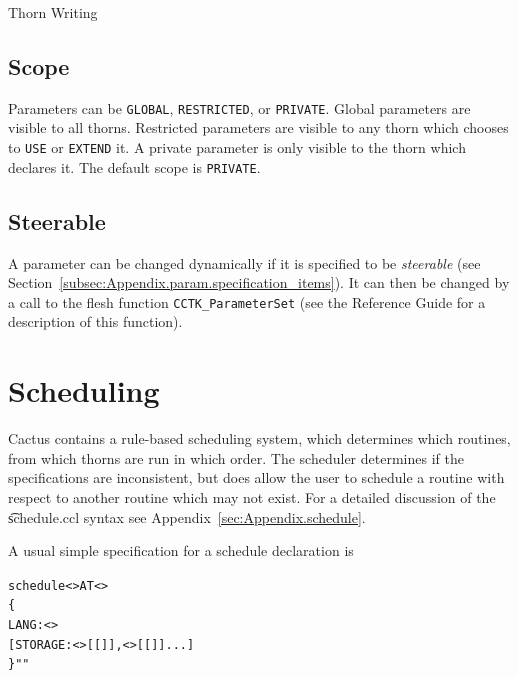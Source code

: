 \begin{cactuspart}{Thorn Writing}

\subsection{Scope}
\label{sec:Cactus_parameters.scope}

Parameters can be \texttt{GLOBAL}, \texttt{RESTRICTED}, or \texttt{PRIVATE}.
Global parameters are visible to all thorns.  Restricted parameters
are visible to any thorn which chooses to \texttt{USE} or \texttt{EXTEND}
it.  A private parameter is only visible to the thorn which declares
it.  The default scope is \texttt{PRIVATE}.

\subsection{Steerable}
\label{sec:Cactus_parameters.steerable}
A parameter can be changed dynamically if it is specified to be
\textit{steerable} (see
Section~\ref{subsec:Appendix.param.specification_items}).
It can then be changed by a call to the flesh function
\texttt{CCTK\_ParameterSet} (see the Reference Guide for a description
of this function).


\section{Scheduling}
\label{chap:scheduling}

Cactus contains a rule-based scheduling system, which determines which
routines, from which thorns are run in which order.  The scheduler
determines if the specifications are inconsistent, but does allow the
user to schedule a routine with respect to another routine which may not
exist.
For a detailed discussion of the {\t schedule.ccl} syntax see
Appendix~\ref{sec:Appendix.schedule}.

A usual simple specification for a schedule declaration is
\begin{alltt}schedule <> AT <>
\{
  LANG: <>
  [STORAGE:       <>[[]],<>[[]]...]
\} ""
\end{alltt}


\end{cactuspart}

